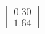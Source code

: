 \documentclass[preview]{standalone}
\begin{document}
\begin{align*}
\begin{bmatrix} 0.30 \\ 1.64 \end{bmatrix}
\end{align*}
\end{document}
